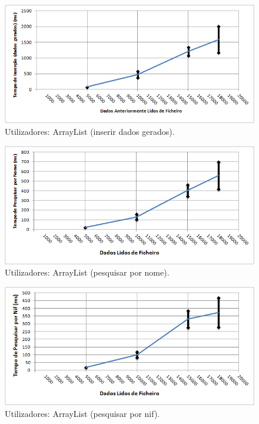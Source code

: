 \documentclass[a5paper,twocolumn, 11pt]{article}
\begin{document}
\begin{figure}[h!b!t!]
    \caption[Utilizadores: ArrayList (inserir dados gerados)]{Utilizadores: ArrayList (inserir dados gerados).}
    \label{hashtable}
    \centering
        \includegraphics[width=400pt]{user_c1_o2.png}
\end{figure}
\begin{figure}[h!b!t!]
    \caption[Utilizadores: ArrayList (pesquisar por nome)]{Utilizadores: ArrayList (pesquisar por nome).}
    \label{hashtable}
    \centering
        \includegraphics[width=400pt]{user_c1_o3.png}
\end{figure}
\begin{figure}[h!b!t!]
    \caption[Utilizadores: ArrayList (pesquisar por nif)]{Utilizadores: ArrayList (pesquisar por nif).}
    \label{hashtable}
    \centering
        \includegraphics[width=400pt]{user_c1_o4.png}
\end{figure}
\end{document}
